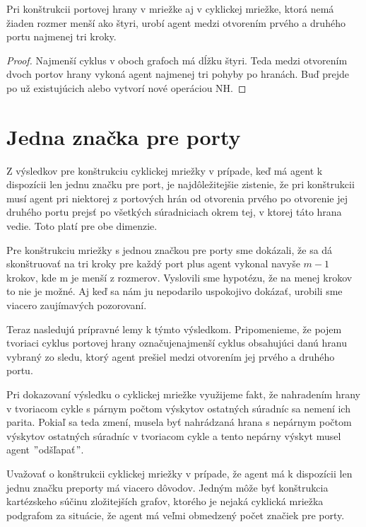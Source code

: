 \begin{lem}
Pri konštrukcii portovej hrany v mriežke aj v cyklickej mriežke, ktorá
nemá žiaden rozmer menší ako štyri, 
urobí agent medzi otvorením prvého a druhého
portu najmenej tri kroky.
\end{lem}
\begin{proof}
Najmenší cyklus v oboch grafoch má dĺžku štyri. 
Teda medzi otvorením dvoch portov
hrany vykoná agent najmenej tri pohyby po hranách. Buď prejde po už
existujúcich alebo vytvorí nové operáciou NH.
\end{proof}

\section{Jedna značka pre porty}

Z výsledkov pre konštrukciu cyklickej mriežky v prípade, keď má agent k
dispozícii len jednu značku pre port, je najdôležitejšie zistenie, že pri
konštrukcii musí agent pri niektorej z portových hrán od otvorenia prvého po
otvorenie jej druhého portu prejsť po všetkých súradniciach okrem tej, v
ktorej táto hrana vedie. Toto platí pre obe dimenzie.

Pre konštrukciu mriežky s jednou značkou pre porty sme dokázali, že sa dá
skonštruovať na tri kroky pre každý port plus agent vykonal navyše $m-1$
krokov, kde m je menší z rozmerov. Vyslovili sme hypotézu, že na menej
krokov to nie je možné. Aj keď sa nám ju nepodarilo uspokojivo dokázať,
urobili sme viacero zaujímavých pozorovaní.

Teraz nasledujú prípravné lemy k týmto výsledkom. Pripomenieme, že pojem
tvoriaci cyklus portovej hrany označujenajmenší cyklus obsahujúci danú hranu
vybraný zo sledu, ktorý agent prešiel medzi otvorením jej prvého a druhého
portu.

Pri dokazovaní výsledku o cyklickej mriežke využijeme fakt, že nahradením
hrany v tvoriacom cykle s párnym počtom výskytov ostatných súradníc sa nemení 
ich parita. Pokiaľ sa teda zmení, musela byť nahrádzaná hrana s nepárnym
počtom výskytov ostatných súradníc v tvoriacom cykle a tento nepárny výskyt
musel agent $"$odšľapať$"$.

Uvažovať o konštrukcii cyklickej mriežky v prípade, že agent má k dispozícii
len jednu značku preporty má viacero dôvodov. Jedným môže byť konštrukcia
kartézskeho súčinu zložitejších grafov, ktorého je nejaká cyklická mriežka
podgrafom za situácie, že agent má veľmi obmedzený počet značiek pre porty.

